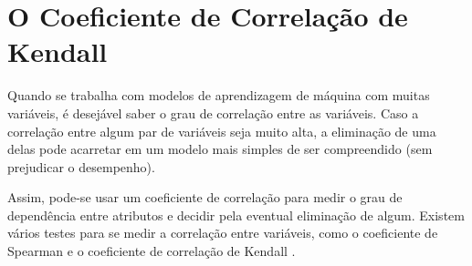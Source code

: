 \section{O Coeficiente de Correlação de Kendall}
Quando se trabalha com modelos de aprendizagem de máquina com muitas variáveis, é
desejável saber o grau de correlação entre as variáveis. Caso a correlação entre
algum par de variáveis seja muito alta, a eliminação de uma delas pode acarretar em
um modelo mais simples de ser compreendido (sem prejudicar o desempenho).
\par Assim, pode-se usar um coeficiente de correlação para medir o grau de dependência
entre atributos e decidir pela eventual eliminação de algum. Existem vários testes
para se medir a correlação entre variáveis, como o coeficiente de Spearman e o
coeficiente de correlação de Kendall \cite{kendall}. 

